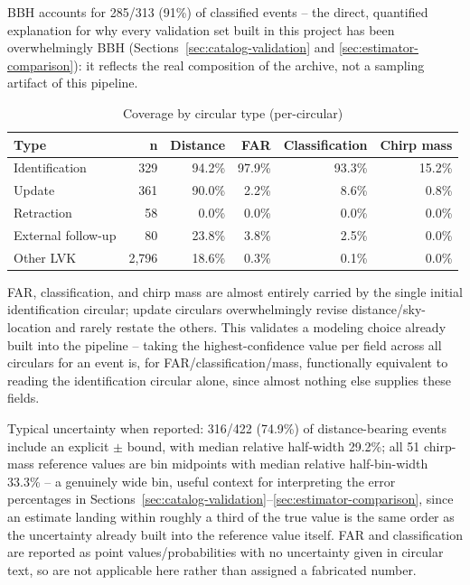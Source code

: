 BBH accounts for 285/313 (91\%) of classified events -- the direct, quantified explanation for why every validation set built in this project has been overwhelmingly BBH (Sections~\ref{sec:catalog-validation} and \ref{sec:estimator-comparison}): it reflects the real composition of the archive, not a sampling artifact of this pipeline.

\begin{table}[H]
\centering
\caption{Coverage by circular type (per-circular)}
\label{tab:availability-by-type}
\begin{tabular}{@{}lrrrrr@{}}
\toprule
Type & n & Distance & FAR & Classification & Chirp mass \\
\midrule
Identification & 329 & 94.2\% & 97.9\% & 93.3\% & 15.2\% \\
Update & 361 & 90.0\% & 2.2\% & 8.6\% & 0.8\% \\
Retraction & 58 & 0.0\% & 0.0\% & 0.0\% & 0.0\% \\
External follow-up & 80 & 23.8\% & 3.8\% & 2.5\% & 0.0\% \\
Other LVK & 2{,}796 & 18.6\% & 0.3\% & 0.1\% & 0.0\% \\
\bottomrule
\end{tabular}
\end{table}

FAR, classification, and chirp mass are almost entirely carried by the single initial identification circular; update circulars overwhelmingly revise distance/sky-location and rarely restate the others. This validates a modeling choice already built into the pipeline -- taking the highest-confidence value per field across all circulars for an event is, for FAR/classification/mass, functionally equivalent to reading the identification circular alone, since almost nothing else supplies these fields.

Typical uncertainty when reported: 316/422 (74.9\%) of distance-bearing events include an explicit $\pm$ bound, with median relative half-width 29.2\%; all 51 chirp-mass reference values are bin midpoints with median relative half-bin-width 33.3\% -- a genuinely wide bin, useful context for interpreting the error percentages in Sections~\ref{sec:catalog-validation}--\ref{sec:estimator-comparison}, since an estimate landing within roughly a third of the true value is the same order as the uncertainty already built into the reference value itself. FAR and classification are reported as point values/probabilities with no uncertainty given in circular text, so are not applicable here rather than assigned a fabricated number.

